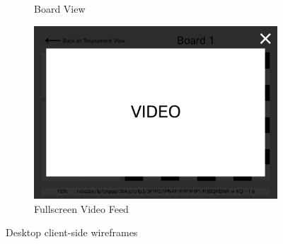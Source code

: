 \begin{figure}[h!]
\begin{subfigure}[h!]{0.40\linewidth}
        \caption{Board View}
        \label{fig:desktop-board-view}
    \end{subfigure}

    \begin{subfigure}[h!]{0.40\linewidth}
        \centering
        \includegraphics[width=\linewidth]{figures/methods/wireframes/desktop-full-screen-video-view.png}
        \caption{Fullscreen Video Feed}
        \label{fig:desktop-fullscreen-video}
    \end{subfigure}
    
    \caption{Desktop client-side wireframes}
    \label{fig:desktop-view-group}
\end{figure}


